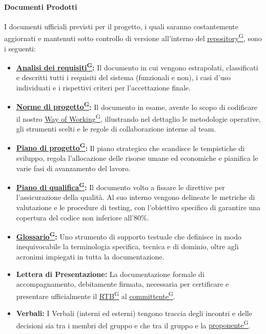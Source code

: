 \documentclass[a4paper,12pt]{article}
\providecommand{\glslink}[2]{\href{https://alittlebyte-19.github.io/Documentazione/glossario.html\#gls-#1}{\underline{#2}\textsuperscript{\scriptsize G}}}
\begin{document}
\paragraph{Documenti Prodotti}
I documenti ufficiali previsti per il progetto, i quali saranno costantemente aggiornati e mantenuti sotto controllo di versione all'interno del \glslink{repository}{repository}, sono i seguenti: 
\begin{itemize}
    \item \textbf{\glslink{analisi-dei-requisiti-adr}{Analisi dei requisiti}:} Il documento in cui vengono estrapolati, classificati e descritti tutti i requisiti del sistema (funzionali e non), i casi d'uso individuati e i rispettivi criteri per l'accettazione finale.
    \item \textbf{\glslink{norme-di-progetto}{Norme di progetto}:} Il documento in esame, avente lo scopo di codificare il nostro \glslink{way-of-working-wow}{Way of Working}, illustrando nel dettaglio le metodologie operative, gli strumenti scelti e le regole di collaborazione interne al team.
    \item \textbf{\glslink{piano-di-progetto}{Piano di progetto}:} Il piano strategico che scandisce le tempistiche di sviluppo, regola l'allocazione delle risorse umane ed economiche e pianifica le varie fasi di avanzamento del lavoro.
    \item \textbf{\glslink{piano-di-qualifica}{Piano di qualifica}:} Il documento volto a fissare le direttive per l'assicurazione della qualità. Al suo interno vengono delineate le metriche di valutazione e le procedure di testing, con l'obiettivo specifico di garantire una copertura del codice non inferiore all'80\%.
    \item \textbf{\glslink{glossario}{Glossario}:} Uno strumento di supporto testuale che definisce in modo inequivocabile la terminologia specifica, tecnica e di dominio, oltre agli acronimi impiegati in tutta la documentazione.
    \item \textbf{Lettera di Presentazione:} La documentazione formale di accompagnamento, debitamente firmata, necessaria per certificare e presentare ufficialmente il \glslink{rtb-requirements-and-technology-baseline}{RTB} al \glslink{committente-proponente}{committente}.
    \item \textbf{Verbali:} I Verbali (interni ed esterni) tengono traccia degli incontri e delle decisioni sia tra i membri del gruppo e che tra il gruppo e la \glslink{committente-proponente}{proponente}.
\end{itemize}
\end{document}

